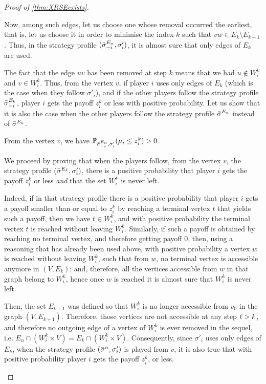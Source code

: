\begin{proof}[Proof of \cref{thm:XRSEexists}]
\begin{claimproof}
    Now, among such edges, let us choose one whose removal occurred the earliest, that is, let us choose it in order to minimise the index $k$ such that $vw \in E_k \setminus E_{k+1}$.
    Thus, in the strategy profile $({\bar{\sigma}}^{E_n}_{-i}, \sigma'_i)$, it is almost sure that only edges of $E_k$ are used.

    The fact that the edge $uv$ has been removed at step $k$ means that we had $u \not\in W_i^k$ and $v \in W_i^k$.
    Thus, from the vertex $v$, if player $i$ uses only edges of $E_k$ (which is the case when they follow $\sigma'_i$), and if the other players follow the strategy profile ${\bar{\sigma}}^{E_k}_{-i}$, player $i$ gets the payoff $z_i^k$ or less with positive probability.
    Let us show that it is also the case when the other players follow the strategy profile ${\bar{\sigma}}^{E_n}$ instead of ${\bar{\sigma}}^{E_k}$.

\begin{claim}
    From the vertex $v$, we have $\mathbb{P}_{{\bar{\sigma}}^{E_n}_{-i}, \sigma'_i}(\mu_i \leq z_i^k) > 0$.
\end{claim}

\begin{claimproof}
    We proceed by proving that when the players follow, from the vertex $v$, the strategy profile $({\bar{\sigma}}^{E_k}, \sigma'_i)$, there is a positive probability that player $i$ gets the payoff $z_i^k$ or less \emph{and} that the set $W_i^k$ is never left.

    Indeed, if in that strategy profile there is a positive probability that player $i$ gets a payoff smaller than or equal to $z_i^k$ by reaching a terminal vertex $t$ that yields such a payoff, then we have $t \in W_i^k$, and with positive probability the terminal vertex $t$ is reached without leaving $W_i^k$.
    Similarly, if such a payoff is obtained by reaching no terminal vertex, and therefore getting payoff $0$, then, using a reasoning that has already been used above, with positive probability a vertex $w$ is reached without leaving $W_i^k$, such that from $w$, no terminal vertex is accessible anymore in $(V, E_k)$; and, therefore, all the vertices accessible from $w$ in that graph belong to $W_i^k$, hence once $w$ is reached it is almost sure that $W_i^k$ is never left.

    Then, the set $E_{k+1}$ was defined so that $W_i^k$ is no longer accessible from $v_0$ in the graph $(V, E_{k+1})$.
    Therefore, those vertices are not accessible at any step $\ell > k$, and therefore no outgoing edge of a vertex of $W_i^k$ is ever removed in the sequel, i.e. $E_n \cap (W_i^k \times V) = E_k \cap (W_i^k \times V)$.
    Consequently, since $\sigma'_i$ uses only edges of $E_k$, when the strategy profile $({\bar{\sigma}}^n, \sigma'_i)$ is played from $v$, it is also true that with positive probability player $i$ gets the payoff $z_i^k$, or less.
\end{claimproof}
    

\end{claimproof}
\end{proof}
